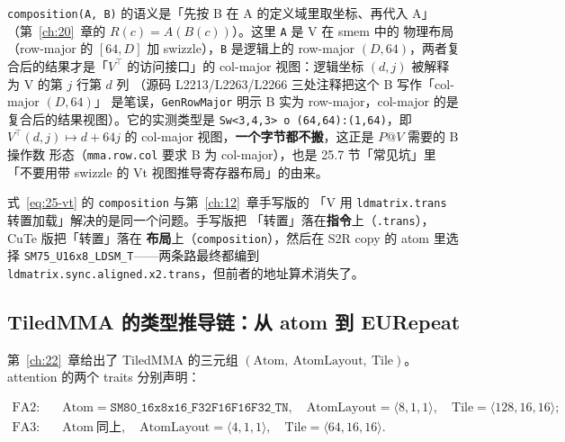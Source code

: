 \texttt{composition\allowbreak{}(A,\allowbreak{} B)} 的语义是「先按 B 在 A 的定义域里取坐标、再代入 A」
（第~\ref{ch:20}~章的 $R(c)=A(B(c))$）。这里 \texttt{A} 是 V 在 smem 中的
物理布局（row-major 的 $[64,D]$ 加 swizzle），\texttt{B} 是逻辑上的
row-major $(D,64)$，两者复合后的结果才是「$V^\top$ 的访问接口」的
col-major 视图：逻辑坐标 $(d, j)$ 被解释为 V 的第 $j$ 行第 $d$ 列
（源码 L2213/L2263/L2266 三处注释把这个 B 写作「col-major $(D,64)$」
是笔误，\texttt{GenRowMajor} 明示 B 实为 row-major，col-major 的是
复合后的结果视图）。它的实测类型是
\texttt{Sw\allowbreak{}<3,\allowbreak{}4,\allowbreak{}3> o \allowbreak{}(64,\allowbreak{}64):\allowbreak{}(1,\allowbreak{}64)}，即 $V^\top(d,j) \mapsto d + 64j$
的 col-major 视图，\textbf{一个字节都不搬}，这正是 $P@V$ 需要的 B 操作数
形态（\texttt{mma.row.col} 要求 B 为 col-major），也是 25.7 节「常见坑」里
「不要用带 swizzle 的 Vt 视图推导寄存器布局」的由来。

\begin{remark}
  式~\eqref{eq:25-vt} 的 \texttt{composition} 与第~\ref{ch:12}~章手写版的
  「V 用 \texttt{ldmatrix.\allowbreak{}trans} 转置加载」解决的是同一个问题。手写版把
  「转置」落在\textbf{指令}上（\texttt{.trans}），CuTe 版把「转置」落在
  \textbf{布局}上（\texttt{composition}），然后在 S2R copy 的 atom 里选择
  \texttt{SM75\_\allowbreak{}U16x8\_\allowbreak{}LDSM\_\allowbreak{}T}——两条路最终都编到
  \texttt{ldmatrix.\allowbreak{}sync.\allowbreak{}aligned.\allowbreak{}x2.trans}，但前者的地址算术消失了。
\end{remark}

\subsection{TiledMMA 的类型推导链：从 atom 到 EURepeat}

第~\ref{ch:22}~章给出了 TiledMMA 的三元组
$(\mathrm{Atom},\ \mathrm{AtomLayout},\ \mathrm{Tile})$。attention 的两个
traits 分别声明：

\begin{align}
  \text{FA2:}\quad & \mathrm{Atom}=\mathtt{SM80\_\allowbreak{}16x8x16\_\allowbreak{}F32F16F16F32\_\allowbreak{}TN},\quad
    \mathrm{AtomLayout}=\langle 8,1,1\rangle,\quad \mathrm{Tile}=\langle 128,16,16\rangle ;
  \label{eq:25-mma2}\\
  \text{FA3:}\quad & \mathrm{Atom}\ \text{同上},\quad
    \mathrm{AtomLayout}=\langle 4,1,1\rangle,\quad \mathrm{Tile}=\langle 64,16,16\rangle .
  \label{eq:25-mma3}
\end{align}


